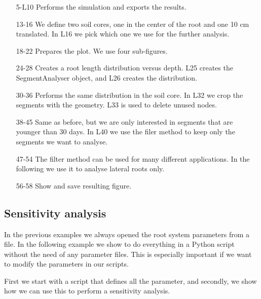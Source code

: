 \documentclass[a4paper]{article}
\begin{document}
\begin{itemize}

\item[5-L10] Performs the simulation and exports the results.

\item[13-16] We define two soil cores, one in the center of the root and one 10 cm translated. In L16 we pick which one we use for the further analysis. 

\item[18-22] Prepares the plot. We use four sub-figures. 

\item[24-28] Creates a root length distribution versus depth. L25 creates the SegmentAnalyser object, and L26 creates the distribution.

\item[30-36] Performs the same distribution in the soil core. In L32 we crop the segments with the geometry. L33 is used to delete unused nodes. 

\item[38-45] Same as before, but we are only interested in segments that are younger than 30 days. In L40 we use the filer method to keep only the segments we want to analyse. 

\item[47-54] The filter method can be used for many different applications. In the following we use it to analyse lateral roots only. 

\item[56-58] Show and save resulting figure.

\end{itemize}



\subsection{Sensitivity analysis} \label{sec:sa}

In the previous examples we always opened the root system parameters from a file. 
In the following example we show to do everything in a Python script without the need of any parameter files. 
This is especially important if we want to modify the parameters in our scripts. 

First we start with a script that defines all the parameter, and secondly, we show how we can use this to perform a sensitivity analysis.


\end{document}
